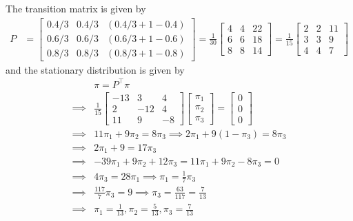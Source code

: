 The transition matrix is given by
\begin{align*}
    P
     & =
    \begin{bmatrix}
        0.4/3 & 0.4/3 & (0.4/3 + 1 - 0.4) \\
        0.6/3 & 0.6/3 & (0.6/3 + 1 - 0.6) \\
        0.8/3 & 0.8/3 & (0.8/3 + 1 - 0.8)
    \end{bmatrix}
    =
    \frac{1}{30}
    \begin{bmatrix}
        4 & 4 & 22 \\
        6 & 6 & 18 \\
        8 & 8 & 14
    \end{bmatrix}
    =
    \frac{1}{15}
    \begin{bmatrix}
        2 & 2 & 11 \\
        3 & 3 & 9  \\
        4 & 4 & 7
    \end{bmatrix}
\end{align*}
and the stationary distribution is given by
\begin{align*}
     &
    \pi
    =
    P^\top \pi
    \\
    \implies
     &
    \frac{1}{15}
    \begin{bmatrix}
        -13 & 3   & 4  \\
        2   & -12 & 4  \\
        11  & 9   & -8
    \end{bmatrix}
    \begin{bmatrix}
        \pi_{1} \\
        \pi_{2} \\
        \pi_{3}
    \end{bmatrix}
    =
    \begin{bmatrix}
        0 \\
        0 \\
        0
    \end{bmatrix}
    \\
    \implies
     &
    11 \pi_{1} + 9 \pi_{2}
    =
    8 \pi_{3}
    \implies
    2 \pi_{1} + 9(1 - \pi_{3})
    =
    8 \pi_{3}
    \\
    \implies
     &
    2 \pi_{1} + 9
    =
    17 \pi_{3}
    \\
    \implies
     &
    -39 \pi_{1} + 9 \pi_{2} + 12 \pi_{3}
    =
    11 \pi_{1} + 9 \pi_{2} - 8 \pi_{3}
    =
    0
    \\
    \implies
     &
    4 \pi_{3}
    =
    28 \pi_{1}
    \implies
    \pi_{1}
    =
    \frac{1}{7}
    \pi_{3}
    \\
    \implies
     &
    \frac{117}{7} \pi_{3}
    =
    9
    \implies
    \pi_{3}
    =
    \frac{63}{117}
    =
    \frac{7}{13}
    \\
    \implies
     &
    \boxed{
        \pi_{1}
        =
        \frac{1}{13}
        ,
        \pi_{2}
        =
        \frac{5}{13}
        ,
        \pi_{3}
        =
        \frac{7}{13}
    }
\end{align*}
